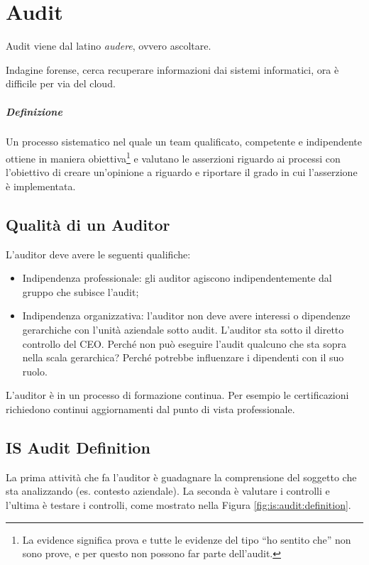 \chapter{Audit}
\label{audit}

Audit viene dal latino \textit{audere}, ovvero ascoltare.

Indagine forense, cerca recuperare informazioni dai sistemi informatici, ora è
difficile per via del cloud.

\paragraph*{Definizione}

Un processo sistematico nel quale un team qualificato, competente e
indipendente ottiene in maniera obiettiva\footnote{La evidence significa prova e
tutte le evidenze del tipo ``ho sentito che'' non sono prove, e per questo non
possono far parte dell'audit.} e valutano le asserzioni riguardo ai processi
con l'obiettivo di creare un'opinione a riguardo e riportare il grado in cui
l'asserzione è implementata.


\section{Qualità di un Auditor}

L'auditor deve avere le seguenti qualifiche:
\begin{itemize}
\item Indipendenza professionale: gli auditor agiscono indipendentemente dal
gruppo che subisce l'audit;
\item Indipendenza organizzativa: l'auditor non deve avere interessi o
dipendenze gerarchiche con l'unità aziendale sotto audit. L'auditor sta sotto
il diretto controllo del CEO. Perché non può eseguire l'audit qualcuno che sta
sopra nella scala gerarchica? Perché potrebbe influenzare
i dipendenti con il suo ruolo.
\end{itemize}

L'auditor è in un processo di formazione continua. Per esempio le 
certificazioni richiedono continui aggiornamenti dal punto di vista 
professionale.

\section{IS Audit Definition}

La prima attività che fa l'auditor è guadagnare la comprensione del soggetto
che sta analizzando (es. contesto aziendale).
La seconda è valutare i controlli e l'ultima è testare i controlli, come
mostrato nella Figura \ref{fig:is:audit:definition}.

